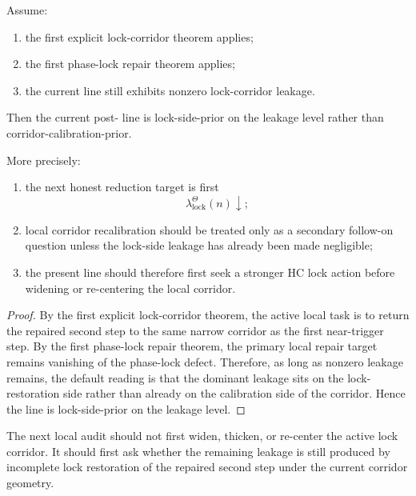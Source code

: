 \begin{theorem}
\label{thm:first-lock-corridor-leakage-orientation-theorem}
Assume:
\begin{enumerate}[leftmargin=2em,label=(\alph*)]
 \item the first explicit lock-corridor theorem applies;
 \item the first phase-lock repair theorem applies;
 \item the current line still exhibits nonzero lock-corridor leakage.
\end{enumerate}
Then the current post- line is lock-side-prior on the leakage level rather than corridor-calibration-prior.

More precisely:
\begin{enumerate}[leftmargin=2em,label=(\roman*)]
 \item the next honest reduction target is first
 \[
 \lambda_{\mathrm{lock}}^{\Theta}(n)\downarrow;
 \]
 \item local corridor recalibration should be treated only as a secondary follow-on question unless the lock-side leakage has already been made negligible;
 \item the present line should therefore first seek a stronger HC lock action before widening or re-centering the local corridor.
\end{enumerate}
\end{theorem}

\begin{proof}
By the first explicit lock-corridor theorem, the active local task is to return the repaired second step to the same narrow corridor as the first near-trigger step. By the first phase-lock repair theorem, the primary local repair target remains vanishing of the phase-lock defect. Therefore, as long as nonzero leakage remains, the default reading is that the dominant leakage sits on the lock-restoration side rather than already on the calibration side of the corridor. Hence the line is lock-side-prior on the leakage level.
\end{proof}

\begin{corollary}
\label{cor:current-leakage-working-rule}
The next local audit should not first widen, thicken, or re-center the active lock corridor. It should first ask whether the remaining leakage is still produced by incomplete lock restoration of the repaired second step under the current corridor geometry.
\end{corollary}

